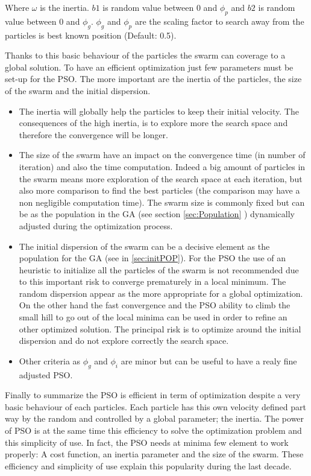 Where $\omega$ is the inertia. $b1$ is random value between 0 and $\phi_p$ and $b2$ is random value between 0 and $\phi_g$. $\phi_g$ and $\phi_p$  are the scaling factor to search away from the particles is best known position (Default: 0.5). 

Thanks to this basic behaviour of the particles the swarm can coverage to a global solution. 
To have an efficient optimization just few parameters must be set-up for the PSO.  
The more important are the inertia of the particles, the size of the swarm and the initial dispersion.
\begin{itemize}
\item The inertia will globally help the particles to keep their initial velocity. The consequences of the high inertia, is to explore more the search space and therefore the convergence will be longer. 
\item The size of the swarm  have an impact on the convergence time (in number of iteration) and  also the time computation. Indeed a big amount of particles in the swarm  means more exploration of the search space at each iteration, but also more comparison to find the best particles (the comparison may have a non negligible computation time). 
The swarm size is commonly fixed but can be as the population in the GA (see section \ref{sec:Population} ) dynamically adjusted during the optimization process. 

\item The initial dispersion of the swarm can be a decisive element as the population for the GA (see in \ref{sec:initPOP}). For the PSO the use of an heuristic to initialize all the particles of the swarm is not recommended due to this important risk to converge prematurely in a local minimum. The random dispersion appear as the more appropriate for a global optimization. On the other hand the fast convergence and the PSO ability to climb the small hill to go out of the local minima can be used in order to refine an other optimized solution. The principal risk is to optimize around the initial dispersion and do not explore correctly the search space.  
\item Other criteria as $\phi_g$ and $\phi_i$ are minor but can be useful to have a realy fine adjusted PSO.
\end{itemize}

Finally to summarize the PSO is efficient in term of optimization despite a very basic behaviour of each  particles. Each particle has this own velocity defined part way by the random and controlled by a global parameter; the inertia.
 The power of PSO is at the same time this efficiency to solve the optimization problem and this simplicity of use. In fact, the PSO needs at minima few element to work properly:
 A cost function, an inertia parameter and the size of the swarm. These efficiency and simplicity of use explain this popularity during the last decade.
 





